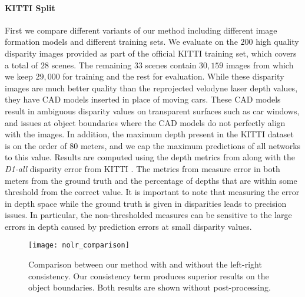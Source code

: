 \documentclass[10pt,twocolumn,letterpaper]{article}
\begin{document}
\paragraph{KITTI Split}
First we compare different variants of our method including different image formation models and different training sets. 
We evaluate on the $200$ high quality disparity images provided as part of the official KITTI training set, which covers a total of $28$ scenes. The remaining $33$ scenes contain $30,159$ images from which we keep $29,000$ for training and the rest for evaluation.
While these disparity images are much better quality than the reprojected velodyne laser depth values, they have CAD models inserted in place of moving cars. 
These CAD models result in ambiguous disparity values on transparent surfaces such as car windows, and issues at object boundaries where the CAD models do not perfectly align with the images.
In addition, the maximum depth present in the KITTI dataset is on the order of $80$ meters, and we cap the maximum predictions of all networks to this value.
Results are computed using the depth metrics from \cite{eigen2014depth} along with the {\it D1-all} disparity error from KITTI \cite{Geiger2012CVPR}.
The metrics from \cite{eigen2014depth} measure error in both meters from the ground truth and the percentage of depths that are within some threshold from the correct value.
It is important to note that measuring the error in depth space while the ground truth is given in disparities leads to precision issues. 
In particular, the non-thresholded measures can be sensitive to the large errors in depth caused by prediction errors at small disparity values.

\begin{figure}[b]
  \centering
  \texttt{[image: nolr\_comparison]}
  \caption{Comparison between our method with and without the left-right consistency. Our consistency term produces superior results on the object boundaries. Both results are shown without post-processing.}
  \label{fig:lr_consistency_results}     
\end{figure}
\end{document}
